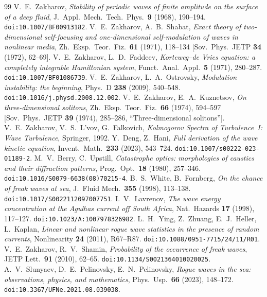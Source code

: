 \documentclass[11pt,reqno]{amsart}
\theoremstyle{plain}
\theoremstyle{definition}
\begin{document}
\begin{thebibliography}{99}
 V.~E.~Zakharov, \emph{Stability of periodic waves of finite amplitude on the surface of a deep fluid}, J.~Appl.\ Mech.\ Tech.\ Phys.\ \textbf{9} (1968), 190--194. \texttt{doi:10.1007/BF00913182}.
 V.~E.~Zakharov, A.~B.~Shabat, \emph{Exact theory of two-dimensional self-focusing and one-dimensional self-modulation of waves in nonlinear media}, Zh.\ Eksp.\ Teor.\ Fiz.\ \textbf{61} (1971), 118--134 [Sov.\ Phys.\ JETP \textbf{34} (1972), 62--69].
 V.~E.~Zakharov, L.~D.~Faddeev, \emph{Korteweg--de Vries equation: a completely integrable Hamiltonian system}, Funct.\ Anal.\ Appl.\ \textbf{5} (1971), 280--287. \texttt{doi:10.1007/BF01086739}.
 V.~E.~Zakharov, L.~A.~Ostrovsky, \emph{Modulation instability: the beginning}, Phys.\ D \textbf{238} (2009), 540--548. \texttt{doi:10.1016/j.physd.2008.12.002}.
 V.~E.~Zakharov, E.~A.~Kuznetsov, \emph{On three-dimensional solitons}, Zh.\ Eksp.\ Teor.\ Fiz.\ \textbf{66} (1974), 594--597 [Sov.\ Phys.\ JETP \textbf{39} (1974), 285--286, ``Three-dimensional solitons''].
 V.~E.~Zakharov, V.~S.~L'vov, G.~Falkovich, \emph{Kolmogorov Spectra of Turbulence~I: Wave Turbulence}, Springer, 1992.
 Y.~Deng, Z.~Hani, \emph{Full derivation of the wave kinetic equation}, Invent.\ Math.\ \textbf{233} (2023), 543--724. \texttt{doi:10.1007/s00222-023-01189-2}.
 M.~V.~Berry, C.~Upstill, \emph{Catastrophe optics: morphologies of caustics and their diffraction patterns}, Prog.\ Opt.\ \textbf{18} (1980), 257--346. \texttt{doi:10.1016/S0079-6638(08)70215-4}.
 B.~S.~White, B.~Fornberg, \emph{On the chance of freak waves at sea}, J.~Fluid Mech.\ \textbf{355} (1998), 113--138. \texttt{doi:10.1017/S0022112097007751}.
 I.~V.~Lavrenov, \emph{The wave energy concentration at the Agulhas current off South Africa}, Nat.\ Hazards \textbf{17} (1998), 117--127. \texttt{doi:10.1023/A:1007978326982}.
 L.~H.~Ying, Z.~Zhuang, E.~J.~Heller, L.~Kaplan, \emph{Linear and nonlinear rogue wave statistics in the presence of random currents}, Nonlinearity \textbf{24} (2011), R67--R87. \texttt{doi:10.1088/0951-7715/24/11/R01}.
 V.~E.~Zakharov, R.~V.~Shamin, \emph{Probability of the occurrence of freak waves}, JETP Lett.\ \textbf{91} (2010), 62--65. \texttt{doi:10.1134/S0021364010020025}.
 A.~V.~Slunyaev, D.~E.~Pelinovsky, E.~N.~Pelinovsky, \emph{Rogue waves in the sea: observations, physics, and mathematics}, Phys.\ Usp.\ \textbf{66} (2023), 148--172. \texttt{doi:10.3367/UFNe.2021.08.039038}.

\end{thebibliography}
\end{document}
